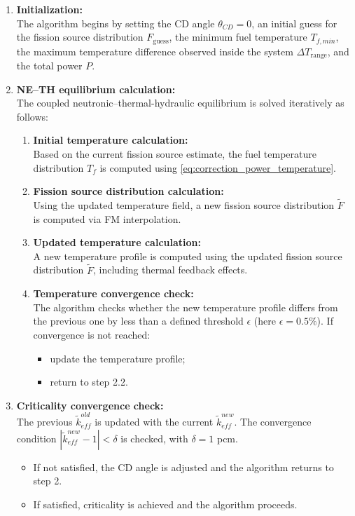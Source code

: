 \documentclass[preprint,review,12pt]{elsarticle}
\begin{document}
\begin{enumerate}
    \item \textbf{Initialization:} \\
    The algorithm begins by setting the CD angle $\theta_{CD} = 0$, an initial guess for the fission source distribution $F_{\text{guess}}$, the minimum fuel temperature $T_{f,min}$, the maximum temperature difference observed inside the system $\Delta T_{\text{range}}$, and the total power $P$.

    \item \textbf{NE--TH equilibrium calculation:} \\
    The coupled neutronic–thermal-hydraulic equilibrium is solved iteratively as follows:

    \begin{enumerate}
        \item \textbf{Initial temperature calculation:} \\
        Based on the current fission source estimate, the fuel temperature distribution $T_f$ is computed using \cref{eq:correction_power_temperature}.

        \item \textbf{Fission source distribution calculation:} \\
        Using the updated temperature field, a new fission source distribution $\tilde{F}$ is computed via FM interpolation.

        \item \textbf{Updated temperature calculation:} \\
        A new temperature profile is computed using the updated fission source distribution $\tilde{F}$, including thermal feedback effects.

        \item \textbf{Temperature convergence check:} \\
        The algorithm checks whether the new temperature profile differs from the previous one by less than a defined threshold $\epsilon$ (here $\epsilon = 0.5\%$). If convergence is not reached:
        \begin{itemize}
            \item update the temperature profile;
            \item return to step 2.2.
        \end{itemize}
    \end{enumerate}

    \item \textbf{Criticality convergence check:} \\
    The previous $\tilde{k}_{eff}^{old}$ is updated with the current $\tilde{k}_{eff}^{new}$. The convergence condition
    $|\tilde{k}_{eff}^{new} - 1| < \delta$ is checked, with $\delta = 1$ pcm.
    \begin{itemize}
        \item If not satisfied, the CD angle is adjusted and the algorithm returns to step 2.
        \item If satisfied, criticality is achieved and the algorithm proceeds.
    \end{itemize}


\end{enumerate}
\end{document}
